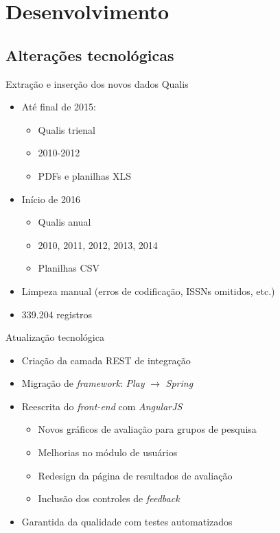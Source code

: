 \documentclass{beamer}
\begin{document}
\section{Desenvolvimento}

\subsection{Alterações tecnológicas}

\begin{frame}{Extração e inserção dos novos dados Qualis}
  \begin{itemize}
    \item Até final de 2015:
    \begin{itemize}
      \item Qualis trienal
      \item 2010-2012
      \item PDFs e planilhas XLS
    \end{itemize}

    \item Início de 2016
      \begin{itemize}
        \item Qualis anual
        \item 2010, 2011, 2012, 2013, 2014
        \item Planilhas CSV
      \end{itemize}

    \item Limpeza manual (erros de codificação, ISSNs omitidos, etc.)
    \item 339.204 registros
  \end{itemize}
\end{frame}

\begin{frame}{Atualização tecnológica}
  \begin{itemize}
    \item Criação da camada REST de integração
    \item Migração de \textit{framework}: \textit{Play} $\rightarrow$ \textit{Spring}
    \item Reescrita do \textit{front-end} com \textit{AngularJS}
    \begin{itemize}
      \item Novos gráficos de avaliação para grupos de pesquisa
      \item Melhorias no módulo de usuários
      \item Redesign da página de resultados de avaliação
      \item Inclusão dos controles de \textit{feedback}
    \end{itemize}
    \item Garantida da qualidade com testes automatizados
  \end{itemize}
\end{frame}
\end{document}
